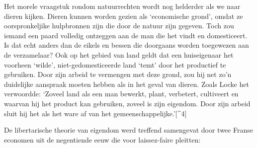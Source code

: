\documentclass[
  a5paper,
  smalldemyvopaper,10pt,twoside,onecolumn,openright,extrafontsizes,hidelinks]{memoir}
\begin{document}
Het morele vraagstuk rondom natuurrechten wordt nog helderder als we
naar dieren kijken. Dieren kunnen worden gezien als `economische grond',
omdat ze oorspronkeljike hulpbronnen zijn die door de natuur zijn
gegeven. Toch zou iemand een paard volledig ontzeggen aan de man die het
vindt en domesticeert. Is dat echt anders dan de eikels en bessen die
doorgaans worden toegewezen aan de verzamelaar? Ook op het gebied van
land geldt dat een huiseigenaar het voorheen `wilde',
niet-gedomesticeerde land `temt' door het productief te gebruiken. Door
zijn arbeid te vermengen met deze grond, zou hij net zo'n duidelijke
aanspraak moeten hebben als in het geval van dieren. Zoals Locke het
verwoordde: `Zoveel land als een man bewerkt, plant, verbetert,
cultiveert en waarvan hij het product kan gebruiken, zoveel is zijn
eigendom. Door zijn arbeid sluit hij het als het ware af van het
gemeenschappelijke.'{[}\^{}4{]}

De libertarische theorie van eigendom werd treffend samengevat door twee
Franse economen uit de negentiende eeuw die voor laissez-faire pleitten:
\end{document}
